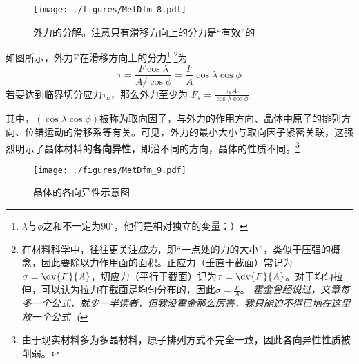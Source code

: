 \begin{figure}[ht]
\centering
\texttt{[image: ./figures/MetDfm\_8.pdf]}
\caption{外力的分解。注意只有滑移方向上的分力是“有效”的} \label{MetDfm_fig8}
\end{figure}

如图所示，外力F在滑移方向上的分力\footnote{$\lambda$与$\phi$之和不一定为$90^\circ$，他们是相对独立的变量：）} \footnote{在材料科学中，往往更关注\textsl{应力}，即“一点处的力的大小”，类似于压强的概念，因此要除以力作用面的面积。正应力（垂直于截面）常记为$\sigma=\dv{F}{A}$，切应力（平行于截面）记为$\tau=\dv{F}{A}$。对于均匀拉伸，可以认为拉力在截面是均匀分布的，因此$\sigma=\frac{F}{A}$。 \textsl{霍金曾经说过，文章每多一个公式，就少一半读者，但我没霍金那么厉害，我只能迫不得已地在这里放一个公式（}}为
\begin{equation}
\tau=\frac{F \cos \lambda}{A/{\cos \phi}}=\frac{F}{A}{\cos \lambda}{\cos \phi}
\end{equation}
若要达到临界切分应力$\tau_k$，那么外力至少为 $F_s=\frac{\tau_k A}{\cos \lambda \cos \phi} $ 

其中，$(\cos \lambda \cos \phi)$被称为取向因子，与外力的作用方向、晶体中原子的排列方向、位错运动的滑移系等有关。可见，外力的最小大小与取向因子紧密关联，这强烈明示了晶体材料的\textbf{各向异性}，即沿不同的方向，晶体的性质不同。\footnote{由于现实材料多为多晶材料，原子排列方式不完全一致，因此各向异性性质被削弱。}

\begin{figure}[ht]
\centering
\texttt{[image: ./figures/MetDfm\_9.pdf]}
\caption{晶体的各向异性示意图} \label{MetDfm_fig9}
\end{figure}
